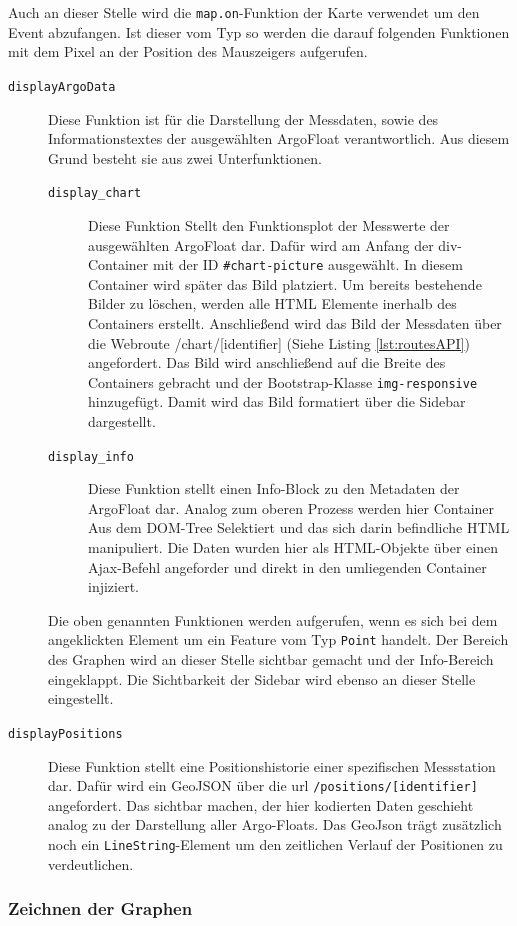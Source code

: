 Auch an dieser Stelle wird die \texttt{map.on}-Funktion der Karte verwendet um den Event abzufangen. Ist dieser vom Typ  so werden die darauf folgenden Funktionen mit dem Pixel an der Position des Mauszeigers aufgerufen.

\begin{description}
 \item [\texttt{displayArgoData}] 
    Diese Funktion ist für die Darstellung der Messdaten, sowie des Informationstextes der ausgewählten ArgoFloat verantwortlich. Aus diesem Grund besteht sie aus zwei Unterfunktionen.
    \begin{description}
    \item [\texttt{display\_chart}] 
        Diese Funktion Stellt den Funktionsplot der Messwerte der ausgewählten ArgoFloat dar. Dafür wird am Anfang der div-Container mit der ID \texttt{\#chart-picture} ausgewählt. In diesem Container wird später das Bild platziert. Um bereits bestehende Bilder zu löschen, werden alle HTML Elemente inerhalb des Containers erstellt. Anschließend wird das Bild der Messdaten über die Webroute /chart/[identifier] (Siehe Listing \ref{lst:routesAPI}) angefordert. Das Bild wird anschließend auf die Breite des Containers gebracht und der Bootstrap-Klasse \texttt{img-responsive} hinzugefügt. Damit wird das Bild formatiert über die Sidebar dargestellt. 
    \item [\texttt{display\_info}]  
        Diese Funktion stellt einen Info-Block zu den Metadaten der ArgoFloat dar. Analog zum oberen Prozess werden hier Container Aus dem DOM-Tree Selektiert und das sich darin befindliche  HTML manipuliert. Die Daten wurden hier als HTML-Objekte über einen Ajax-Befehl angeforder und direkt in den umliegenden Container injiziert.
    \end{description}
    
    Die oben genannten Funktionen werden aufgerufen, wenn es sich bei dem angeklickten Element um ein Feature vom Typ \texttt{Point} handelt. Der Bereich des Graphen wird an dieser Stelle sichtbar gemacht und der Info-Bereich eingeklappt. Die Sichtbarkeit der Sidebar wird ebenso an dieser Stelle eingestellt.
    
 \item [\texttt{displayPositions}] 
    Diese Funktion stellt eine Positionshistorie einer spezifischen Messstation dar. Dafür wird ein GeoJSON über die url \texttt{/positions/[identifier]} angefordert. Das sichtbar machen, der hier kodierten Daten geschieht analog zu der Darstellung aller Argo-Floats. Das GeoJson trägt zusätzlich noch ein \texttt{LineString}-Element um den zeitlichen Verlauf der Positionen zu verdeutlichen.
\end{description}








\subsubsection{Zeichnen der Graphen} \label{sec:ImplementierungPLOTS}









